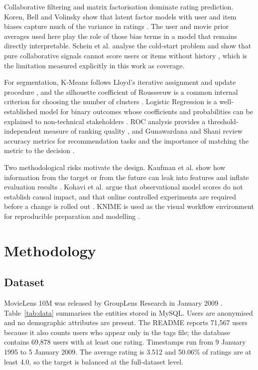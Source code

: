 \documentclass[conference]{IEEEtran}
\begin{document}
Collaborative filtering and matrix factorisation dominate rating prediction. Koren, Bell and Volinsky show that latent factor models with user and item biases capture much of the variance in ratings \cite{b3}. The user and movie prior averages used here play the role of those bias terms in a model that remains directly interpretable. Schein et al. analyse the cold-start problem and show that pure collaborative signals cannot score users or items without history \cite{b4}, which is the limitation measured explicitly in this work as coverage.

For segmentation, K-Means follows Lloyd's iterative assignment and update procedure \cite{b5}, and the silhouette coefficient of Rousseeuw is a common internal criterion for choosing the number of clusters \cite{b6}. Logistic Regression is a well-established model for binary outcomes whose coefficients and probabilities can be explained to non-technical stakeholders \cite{b7}. ROC analysis provides a threshold-independent measure of ranking quality \cite{b8}, and Gunawardana and Shani review accuracy metrics for recommendation tasks and the importance of matching the metric to the decision \cite{b9}.

Two methodological risks motivate the design. Kaufman et al. show how information from the target or from the future can leak into features and inflate evaluation results \cite{b10}. Kohavi et al. argue that observational model scores do not establish causal impact, and that online controlled experiments are required before a change is rolled out \cite{b11}. KNIME is used as the visual workflow environment for reproducible preparation and modelling \cite{b12}.

\section{Methodology}

\subsection{Dataset}
MovieLens 10M was released by GroupLens Research in January 2009 \cite{b1}. Table~\ref{tab:data} summarises the entities stored in MySQL. Users are anonymised and no demographic attributes are present. The README reports 71,567 users because it also counts users who appear only in the tags file; the database contains 69,878 users with at least one rating. Timestamps run from 9 January 1995 to 5 January 2009. The average rating is 3.512 and 50.06\% of ratings are at least 4.0, so the target is balanced at the full-dataset level.
\end{document}
